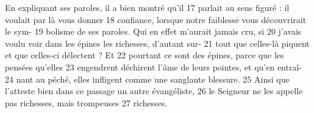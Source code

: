 En expliquant ses paroles, il a bien montré qu'il	 
17	 	parlait au sens figuré : il voulait par là vous donner	 
18	 	confiance, lorsque notre faiblesse vous découvrirait le sym-	 
19	 	bolisme de ses paroles. Qui en effet m'aurait jamais cru, si	 
20	 	j'avais voulu voir dans les épines les richesses, d'autant sur-	 
21	 	tout que celles-là piquent et que celles-ci délectent ? Et	 
22	 	pourtant ce sont des épines, parce que les pensées qu'elles	 
23	 	engendrent déchirent l'âme de leurs pointes, et qu'en entraî-	 
24	 	nant au péché, elles infligent comme une sanglante blessure.	 
25	 	Ainsi que l'atteste bien dans ce passage un autre évangéliste,	 
26	 	le Seigneur ne les appelle pas richesses, mais trompeuses	 
27	 	richesses.